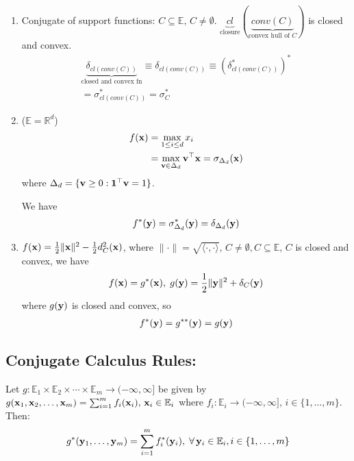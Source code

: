 \documentclass[11pt]{article}
\begin{document}
\begin{example}
    \begin{enumerate}
        \item Conjugate of support functions: 
        $C \subseteq \mathbb{E}, \, C \neq \emptyset$.
        $\underbrace{cl}_{\text{closure}}(\underbrace{conv(C)}_{\text{convex hull of }C})$ is closed 
        and convex.
        \begin{align*}
            \underbrace{\delta_{cl(conv(C))}}_{\text{closed and convex fn}} \equiv 
                \delta_{cl(conv(C))} \equiv (\delta_{cl(conv(C))}^{*})^{*}\\
            = \sigma_{cl(conv(C))}^{*} = \sigma_{C}^{*}
        \end{align*}
        \item ($\mathbb{E} = \mathbb{R}^{d}$)
        \begin{align*}
            f({\mathbf{x}}) &= \max_{1 \le i \le d} x_{i} \\
            &= \max_{{\mathbf{v}} \in \Delta_{d}}{\mathbf{v}}^{\top}{\mathbf{x}} = \sigma_{\Delta_{d}}({\mathbf{x}})
        \end{align*}
        where $\Delta_{d} = \{ {\mathbf{v}} \ge 0:\bm{1}^{\top}{\mathbf{v}} = 1 \}$.

        We have 
        \begin{align*}
            f^{*}({\mathbf{y}}) = \sigma_{\Delta_{d}}^{*}({\mathbf{y}}) = \delta_{\Delta_{d}}({\mathbf{y}})
        \end{align*}
        \item $f({\mathbf{x}}) = \frac{1}{2}\| {\mathbf{x}} \|^{2} - \frac{1}{2}d_{C}^{2}({\mathbf{x}}) $, where 
        $\| \cdot  \| = \sqrt{\langle \cdot ,\cdot  \rangle} , \, C \neq \emptyset, C \subseteq \mathbb{E}$,
        $C$ is closed and convex, we have 
        \begin{align*}
            f({\mathbf{x}}) = g^{*}({\mathbf{x}}), \; g({\mathbf{y}}) = \frac{1}{2}\| {\mathbf{y}} \| ^{2} + \delta_{C}({\mathbf{y}})
        \end{align*}
        where $g({\mathbf{y}})$ is closed and convex, so 
        \begin{align*}
            f^{*}({\mathbf{y}}) = g^{**}({\mathbf{y}}) = g({\mathbf{y}})
        \end{align*}
    \end{enumerate}
\end{example}

\subsection{Conjugate Calculus Rules:}

\begin{theorem}
    Let $g: \mathbb{E}_1 \times \mathbb{E}_2 \times \cdots \times \mathbb{E}_m \to (-\infty,\infty]$ be 
    given by $g({\mathbf{x}}_1,{\mathbf{x}}_2, \ldots ,{\mathbf{x}}_m) = \sum_{i=1}^{m}f_i({\mathbf{x}}_{i}),\, {\mathbf{x}}_{i} \in \mathbb{E}_i$
    where $f_i: \mathbb{E}_i \to (-\infty,\infty],\, i \in \{ 1, \ldots ,m \}$.
    Then:
    \begin{align*}
        g^{*}({\mathbf{y}}_1, \ldots ,{\mathbf{y}}_{m}) = \sum_{i=1}^{m}f_{i}^{*}({\mathbf{y}}_{i}), \; \forall \,{\mathbf{y}}_{i} \in \mathbb{E}_{i},
            i \in \{ 1, \ldots ,m \}
    \end{align*}
\end{theorem}
\end{document}
